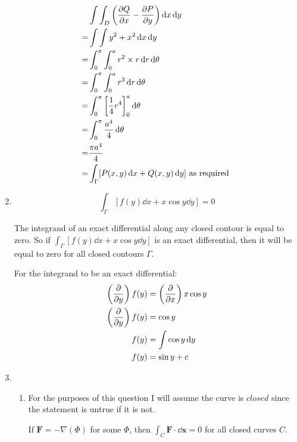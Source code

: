 \documentclass[10pt,\jkfside,a4paper]{article}
\begin{document}
\begin{enumerate}
\begin{equation}
\begin{split}
 & \int\int_D \left(\pdv{Q}{x} - \pdv{P}{y}\right)\dd{x}\dd{y} \\
=& \int \int y^2 + x^2\dd{x}\dd{y} \\
=& \int^{\pi}_0\int^a_0 r^2 \times r\dd{r}\dd{\theta} \\
=& \int^{\pi}_0\int^a_0 r^3\dd{r}\dd{\theta} \\
=& \int^{\pi}_0\left[\frac{1}{4}r^4\right]^a_0\dd{\theta} \\
=& \int^{\pi}_0\frac{a^4}{4}\dd{\theta} \\
=& \frac{\pi a^4}{4} \\
=& \int_\Gamma [P(x, y)\dd{x} + Q(x, y)\dd{y}] \text{ as required } \\
\end{split}
\end{equation}

\item 

\begin{equation}
\int_{\Gamma}\left[f(y)\dd{x} + x\cos{y}\dd{y}\right] = 0
\end{equation}

The integrand of an exact differential along any closed contour is equal to zero. 
So if $\int_{\Gamma}\left[f(y)\dd{x} + x\cos{y}\dd{y}\right]$ is an exact differential, 
then it will be equal to zero for all closed contours $\Gamma$.

For the integrand to be an exact differential:
\begin{equation}
\begin{split}
\left(\pdv{y}\right)f(y) &= \left(\pdv{x}\right)x\cos{y} \\
\left(\pdv{y}\right)f(y) &= \cos{y} \\
f(y) &= \int \cos{y} \dd{y} \\
f(y) &= \sin{y} + c \\
\end{split}
\end{equation}

\item 
\begin{enumerate}[label=(\roman*)]

\item 

For the purposes of this question I will assume the curve is $\textit{closed}$ since the statement is 
untrue if it is not.

If $\mathbf{F} = -\nabla(\Phi)$ for some $\Phi$, then $\int_C \mathbf{F}\cdot \dd{\mathbf{x}} = 0$ for 
all closed curves $C$.


\end{enumerate}
\end{enumerate}
\end{document}
